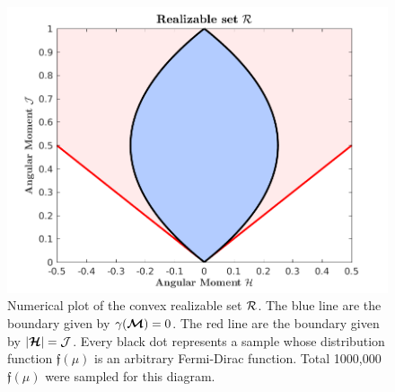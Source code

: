 \begin{figure}
\centering
\includegraphics[width=0.7\linewidth]{figures/RealizableSetFermionic}
\caption[Numerical plot of the convex realizable set $\cR$.]{
Numerical plot of the convex realizable set $\cR$.
The blue line are the boundary given by $\gamma(\boldsymbol{\mathcal{M}}) = 0$. The red line are the boundary given by $|\boldsymbol{\mathcal{H}}| = \mathcal{J}$. Every black dot represents a sample whose distribution function $\mathfrak{f}(\mu)$ is an arbitrary Fermi-Dirac function. Total 1000,000 $\mathfrak{f}(\mu)$ were sampled for this diagram.}
\label{fig:RealizableSetFermionic}
\end{figure}



